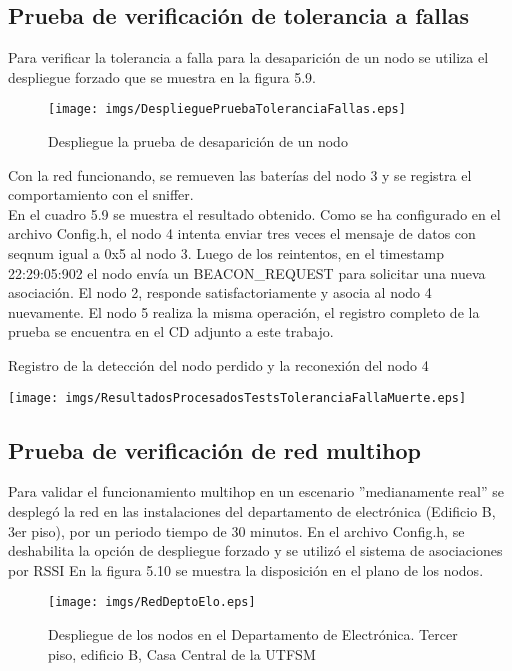 \subsection{Prueba de verificación de tolerancia a fallas}
Para verificar la tolerancia a falla para la desaparición de un nodo se utiliza el despliegue forzado que se muestra en la figura 5.9.

\begin{figure}[H]
	\centering
 	\texttt{[image: imgs/DesplieguePruebaToleranciaFallas.eps]} 
 	\caption{Despliegue la prueba de desaparición de un nodo}
\end{figure}

Con la red funcionando, se remueven las baterías del nodo 3 y se registra el comportamiento con el sniffer.\\

En el cuadro 5.9 se muestra el resultado obtenido. Como se ha configurado en el archivo Config.h, el nodo 4 intenta enviar tres veces el mensaje de datos con seqnum igual a 0x5 al nodo 3. Luego de los reintentos, en el timestamp 22:29:05:902 el nodo envía un BEACON\_REQUEST para solicitar una nueva asociación. El nodo 2, responde satisfactoriamente y asocia al nodo 4 nuevamente. El nodo 5 realiza la misma operación, el registro completo de la prueba se encuentra en el CD adjunto a este trabajo.\\

\begin{table}[H]
\centering
\caption{Registro de la detección del nodo perdido y la reconexión del nodo 4}
 \texttt{[image: imgs/ResultadosProcesadosTestsToleranciaFallaMuerte.eps]}
\end{table}

\subsection{Prueba de verificación de red multihop}
Para validar el funcionamiento multihop en un escenario ''medianamente real'' se desplegó la red en las instalaciones del departamento de electrónica (Edificio B, 3er piso), por un periodo tiempo de 30 minutos. En el archivo Config.h, se deshabilita la opción de despliegue forzado y se utilizó el sistema de asociaciones por RSSI  En la figura 5.10 se muestra la disposición en el plano de los nodos.

\begin{figure}[H]
 \centering
 \texttt{[image: imgs/RedDeptoElo.eps]}
 \caption{Despliegue de los nodos en el Departamento de Electrónica. Tercer piso, edificio B, Casa Central de la UTFSM}
\end{figure}

